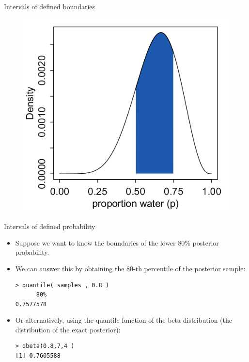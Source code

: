 \documentclass[handout]{beamer}
\begin{document}
\begin{frame}{Intervals of defined boundaries}
\scriptsize{

   \begin{figure}[h!]
	\centering
	\includegraphics[scale=0.45]{pics/interval2.png}
	\end{figure} 




} 

\end{frame}




\begin{frame}[fragile]{Intervals of defined probability}
\scriptsize{
\begin{itemize}

\item Suppose we want to know the boundaries of the lower 80\% posterior probability.

\item We can answer this by obtaining the 80-th percentile of the posterior sample:

\begin{verbatim}
> quantile( samples , 0.8 )
      80% 
0.7577578 
\end{verbatim}

\item Or alternatively, using the quantile function of the beta distribution (the distribution of the exact posterior):


\begin{verbatim}
> qbeta(0.8,7,4 )
[1] 0.7605588 
\end{verbatim}

\end{itemize}


} 

\end{frame}
\end{document}
